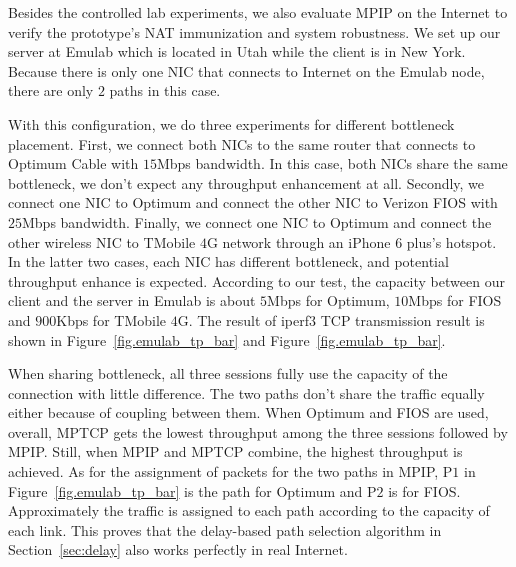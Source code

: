 %

Besides the controlled lab experiments, we also evaluate MPIP on the Internet to verify the prototype's NAT immunization and system robustness. We set up our server at Emulab\cite{emulab} which is located in Utah while the client is in New York. Because there is only one NIC that connects to Internet on the Emulab node, there are only $2$ paths in this case. 

With this configuration, we do three experiments for different bottleneck placement. First, we connect both NICs to the same router that connects to Optimum Cable with $15$Mbps bandwidth. In this case, both NICs share the same bottleneck, we don't expect any throughput enhancement at all. Secondly, we connect one NIC to Optimum and connect the other NIC to Verizon FIOS with $25$Mbps bandwidth. Finally, we connect one NIC to Optimum and connect the other wireless NIC to TMobile $4$G network through an iPhone 6 plus's hotspot. In the latter two cases, each NIC has different bottleneck, and potential throughput enhance is expected. According to our test, the capacity between our client and the server in Emulab is about $5$Mbps for Optimum, $10$Mbps for FIOS and $900$Kbps for TMobile $4$G. The result of iperf3 TCP transmission result is shown in Figure~\ref{fig.emulab_tp_bar} and Figure~\ref{fig.emulab_tp_bar}.

When sharing bottleneck, all three sessions fully use the capacity of the connection with little difference. The two paths don't share the traffic equally either because of coupling between them. When Optimum and FIOS are used, overall, MPTCP gets the lowest throughput among the three sessions followed by MPIP. Still, when MPIP and MPTCP combine, the highest throughput is achieved. As for the assignment of packets for the two paths in MPIP, P$1$ in Figure~\ref{fig.emulab_tp_bar} is the path for Optimum and P$2$ is for FIOS. Approximately the traffic is assigned to each path according to the capacity of each link. This proves that the delay-based path selection algorithm in Section~\ref{sec:delay} also works perfectly in real Internet. 

